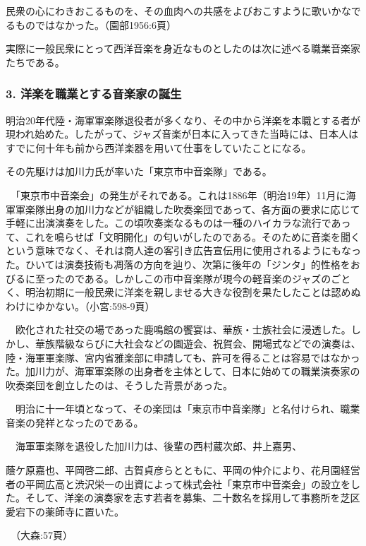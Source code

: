 \begin{gquote}
民衆の心にわきおこるものを、その血肉への共感をよびおこすように歌いかなでるものではなかった。（園部1956:6頁）
\end{gquote}

実際に一般民衆にとって西洋音楽を身近なものとしたのは次に述べる職業音楽家たちである。

\subsubsection{3. 洋楽を職業とする音楽家の誕生}

明治20年代陸・海軍軍楽隊退役者が多くなり、その中から洋楽を本職とする者が現われ始めた。したがって、ジャズ音楽が日本に入ってきた当時には、日本人はすでに何十年も前から西洋楽器を用いて仕事をしていたことになる。

その先駆けは加川力氏が率いた「東京市中音楽隊」である。

\begin{gquote}
　「東京市中音楽会」の発生がそれである。これは1886年（明治19年）11月に海軍軍楽隊出身の加川力などが組織した吹奏楽団であって、各方面の要求に応じて手軽に出演演奏をした。この頃吹奏楽なるものは一種のハイカラな流行であって、これを鳴らせば「文明開化」の匂いがしたのである。そのために音楽を聞くという意味でなく、それは商人達の客引き広告宣伝用に使用されるようにもなった。ひいては演奏技術も凋落の方向を辿り、次第に後年の「ジンタ」的性格をおびるに至ったのである。しかしこの市中音楽隊が現今の軽音楽のジャズのごとく、明治初期に一般民衆に洋楽を親しませる大きな役割を果たしたことは認めぬわけにゆかない。（小宮:598-9頁）
\end{gquote}

\begin{gquote}
　欧化された社交の場であった鹿鳴館の饗宴は、華族・士族社会に浸透した。しかし、華族階級ならびに大社会などの園遊会、祝賀会、開場式などでの演奏は、陸・海軍軍楽隊、宮内省雅楽部に申請しても、許可を得ることは容易ではなかった。加川力が、海軍軍楽隊の出身者を主体として、日本に始めての職業演奏家の吹奏楽団を創立したのは、そうした背景があった。\par{}　明治に十一年頃となって、その楽団は「東京市中音楽隊」と名付けられ、職業音楽の発祥となったのである。\par{}　海軍軍楽隊を退役した加川力は、後輩の西村蔵次郎、井上嘉男、
\end{gquote}

\begin{gquote}
蔭ケ原嘉也、平岡啓二郎、古賀貞彦らとともに、平岡の仲介により、花月園経営者の平岡広高と渋沢栄一の出資によって株式会社「東京市中音楽会」の設立をした。そして、洋楽の演奏家を志す若者を募集、二十数名を採用して事務所を芝区愛宕下の薬師寺に置いた。\par{}　（大森:57頁）
\end{gquote}

